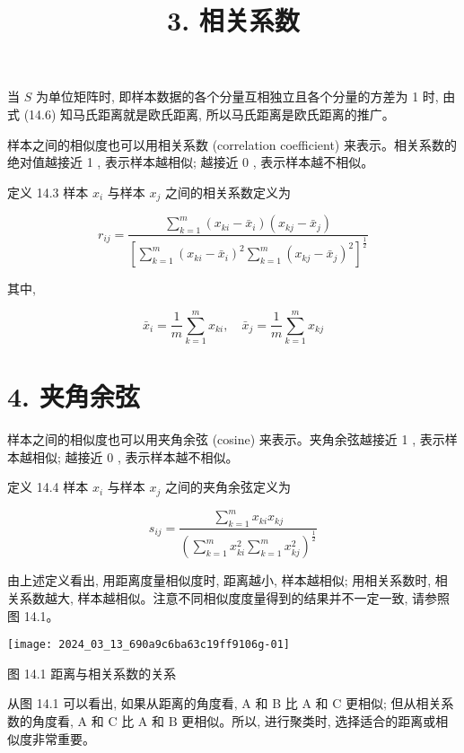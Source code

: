 \documentclass[10pt]{article}
\title{3. 相关系数 }
\author{}
\date{}
\begin{document}
\maketitle
当 $S$ 为单位矩阵时, 即样本数据的各个分量互相独立且各个分量的方差为 1 时, 由式 (14.6) 知马氏距离就是欧氏距离, 所以马氏距离是欧氏距离的推广。

样本之间的相似度也可以用相关系数 (correlation coefficient) 来表示。相关系数的绝对值越接近 1 , 表示样本越相似; 越接近 0 , 表示样本越不相似。

定义 14.3 样本 $x_{i}$ 与样本 $x_{j}$ 之间的相关系数定义为


\begin{equation*}
r_{i j}=\frac{\sum_{k=1}^{m}\left(x_{k i}-\bar{x}_{i}\right)\left(x_{k j}-\bar{x}_{j}\right)}{\left[\sum_{k=1}^{m}\left(x_{k i}-\bar{x}_{i}\right)^{2} \sum_{k=1}^{m}\left(x_{k j}-\bar{x}_{j}\right)^{2}\right]^{\frac{1}{2}}} \tag{14.8}
\end{equation*}


其中,

$$
\bar{x}_{i}=\frac{1}{m} \sum_{k=1}^{m} x_{k i}, \quad \bar{x}_{j}=\frac{1}{m} \sum_{k=1}^{m} x_{k j}
$$

\section*{4. 夹角余弦}
样本之间的相似度也可以用夹角余弦 (cosine) 来表示。夹角余弦越接近 1 , 表示样本越相似; 越接近 0 , 表示样本越不相似。

定义 14.4 样本 $x_{i}$ 与样本 $x_{j}$ 之间的夹角余弦定义为


\begin{equation*}
s_{i j}=\frac{\sum_{k=1}^{m} x_{k i} x_{k j}}{\left(\sum_{k=1}^{m} x_{k i}^{2} \sum_{k=1}^{m} x_{k j}^{2}\right)^{\frac{1}{2}}} \tag{14.9}
\end{equation*}


由上述定义看出, 用距离度量相似度时, 距离越小, 样本越相似; 用相关系数时, 相关系数越大, 样本越相似。注意不同相似度度量得到的结果并不一定一致, 请参照图 14.1。

\begin{center}
\texttt{[image: 2024\_03\_13\_690a9c6ba63c19ff9106g-01]}
\end{center}

图 14.1 距离与相关系数的关系

从图 14.1 可以看出, 如果从距离的角度看, A 和 B 比 A 和 C 更相似; 但从相关系数的角度看, $\mathrm{A}$ 和 $\mathrm{C}$ 比 $\mathrm{A}$ 和 $\mathrm{B}$ 更相似。所以, 进行聚类时, 选择适合的距离或相似度非常重要。
\end{document}
